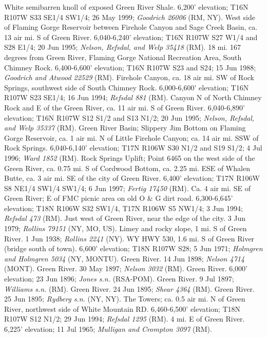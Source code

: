 White semibarren knoll of exposed Green River Shale. 6,200' elevation;
T16N R107W S33 SE1/4 SW1/4; 26 May 1999; \textit{Goodrich 26006} (RM, NY).
West side of Flaming Gorge Reservoir between Firehole Canyon and Sage Creek
Basin, ca. 13 air mi. S of Green River. 6,040-6,240' elevation; T16N R107W S27
W1/4 and S28 E1/4; 20 Jun 1995; \textit{Nelson, Refsdal, and Welp 35418} (RM).
18 mi. 167 degrees from Green River, Flaming Gorge National Recreation Area, 
South Chimney Rock. 6,400-6,600' elevation; T16N R107W S23 and S24; 15 Jun 1988;
\textit{Goodrich and Atwood 22529} (RM).
Firehole Canyon, ca. 18 air mi. SW of Rock Springs, southwest side of South
Chimney Rock. 6,000-6,600' elevation; T16N R107W S23 SE1/4; 16 Jun 1994;
\textit{Refsdal 881} (RM).
Canyon N of North Chimney Rock and E of the Green River, ca. 11 air mi. S of
Green River. 6,040-6,890' elevation; T16N R107W S12 S1/2 and S13 N1/2;
20 Jun 1995; \textit{Nelson, Refsdal, and Welp 35337} (RM).
Green River Basin; Slippery Jim Bottom on Flaming Gorge Reservoir, ca. 1 air mi.
N of Little Firehole Canyon; ca. 14 air mi. SSW of Rock Springs.
6,040-6,140' elevation; T17N R106W S30 N1/2 and S19 S1/2; 4 Jul 1996;
\textit{Ward 1852} (RM).
Rock Springs Uplift; Point 6465 on the west side of the Green River, ca. 0.75
mi. S of Cordwood Bottom, ca. 2.25 mi. ESE of Whalen Butte, ca. 3 air mi. SE of
the city of Green River. 6,400' elevation; T17N R106W S8 NE1/4 SW1/4 SW1/4;
6 Jun 1997; \textit{Fertig 17450} (RM).
Ca. 4 air mi. SE of Green River; E of FMC picnic area on old O \& G dirt road.
6,300-6,645' elevation; T18N R106W S32 SW1/4, T17N R106W S5 NW1/4; 3 Jun 1994;
\textit{Refsdal 473} (RM).
Just west of Green River, near the edge of the city. 3 Jun 1979;
\textit{Rollins 79151} (NY, MO, US).
Limey and rocky slope, 1 mi. S of Green River. 1 Jun 1938;
\textit{Rollins 2241} (NY).
WY HWY 530, 1.6 mi. S of Green River (bridge south of town). 6,600' elevation;
T18N R107W S28; 5 Jun 1971; \textit{Holmgren and Holmgren 5034} (NY, MONTU).
Green River. 14 Jun 1898; \textit{Nelson 4714} (MONT).
Green River. 30 May 1897; \textit{Nelson 3032} (RM).
Green River. 6,000' elevation; 23 Jun 1896; \textit{Jones s.n.} (RSA-POM).
Green River. 9 Jul 1897; \textit{Williams s.n.} (RM).
Green River. 24 Jun 1895; \textit{Shear 4364} (RM).
Green River. 25 Jun 1895; \textit{Rydberg s.n.} (NY, NY).
The Towers; ca. 0.5 air mi. N of Green River, northwest side of White Mountain
RD. 6,460-6,500' elevation; T18N R107W S12 N1/2; 29 Jun 1994;
\textit{Refsdal 1295} (RM).
4 mi. E of Green River. 6,225' elevation; 11 Jul 1965;
\textit{Mulligan and Crompton 3097} (RM).
